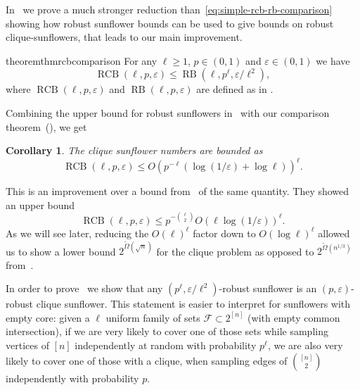 \documentclass[10pt,a4paper]{article}
\newcommand{\RCB}{\mathop{RCB}}
\newcommand{\RB}{\mathop{RB}}
\newtheorem{corollary}[theorem]{Corollary}
\begin{document}
In~ we prove a much stronger reduction than~\eqref{eq:simple-rcb-rb-comparison} showing how robust sunflower bounds can be used to give bounds on robust clique-sunflowers, that leads to our main improvement.

\begin{restatable}{theorem}{thmrcbcomparison}
\label{thm:rcb-comparison}
For any $\ell \geq 1$, $p \in (0,1)$ and $\varepsilon \in (0,1)$ we have
\begin{equation*}
    \RCB(\ell, p, \varepsilon) \leq \RB(\ell, p^\ell, \varepsilon/ \ell^2),
\end{equation*}
where $\RCB(\ell, p, \varepsilon)$ and $\RB(\ell, p, \varepsilon)$ are defined as in .
\end{restatable}

Combining the upper bound for robust sunflowers in~ with our comparison theorem~(), we get
\begin{corollary}
\label{cor:our-rcb}
    The clique sunflower numbers are bounded as
    \begin{equation*}
        \RCB(\ell, p, \varepsilon) \leq O(p^{-\ell} (\log(1/\varepsilon) + \log \ell))^{\ell}.
    \end{equation*}
\end{corollary}


This is an improvement over a bound from~\cite[Lemma 3.2]{cavalar2022} of the same quantity. They showed an upper bound
\begin{equation}
\label{eq:cavalar-rcb-bound}
    \RCB(\ell, p, \varepsilon) \leq p^{-\binom{\ell}{2}} O(\ell \log (1/\varepsilon))^\ell.
\end{equation}
As we will see later, reducing the $O(\ell)^\ell$ factor down to $O(\log \ell)^\ell$ allowed us to show a lower bound $2^{\tilde\Omega(\sqrt{n})}$ for the clique problem as opposed to $2^{\tilde\Omega(n^{1/3})}$ from~\cite{alon87,cavalar2022}.

In order to prove~ we show that any $(p^\ell, \varepsilon/\ell^2)$-robust sunflower is an $(p, \varepsilon)$-robust clique sunflower. This statement is easier to interpret for sunflowers with empty core: given a $\ell$ uniform family of sets $\mathcal{F} \subset 2^{[n]}$ (with empty common intersection), if we are very likely to cover one of those sets while sampling vertices of $[n]$ independently at random with probability $p^{\ell}$, we are also very likely to cover one of those with a clique, when sampling edges of $\binom{[n]}{2}$ independently with probability $p$.
\end{document}
